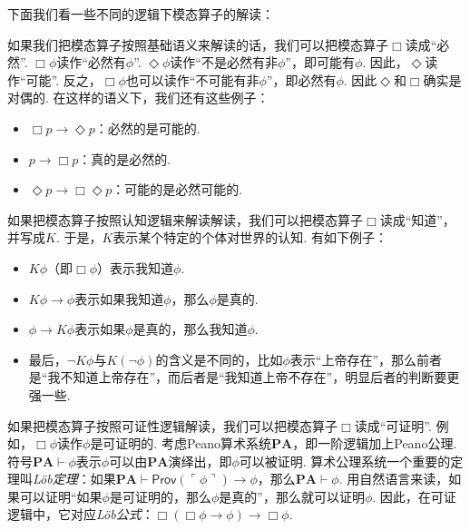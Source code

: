 下面我们看一些不同的逻辑下模态算子的解读：

\begin{example}[基础语义]
如果我们把模态算子按照基础语义来解读的话，我们可以把模态算子$\Box$读成“必然”. $\Box\phi$读作“必然有$\phi$”. $\Diamond\phi$读作“不是必然有非$\phi$”，即可能有$\phi$. 因此，$\Diamond$读作“可能”. 反之，$\Box\phi$也可以读作“不可能有非$\phi$”，即必然有$\phi$. 因此$\Diamond$和$\Box$确实是对偶的. 在这样的语义下，我们还有这些例子：
\begin{itemize}
    \item $\Box p\to\Diamond p$：必然的是可能的.
    \item $p\to\Box p$：真的是必然的.
    \item $\Diamond p\to\Box\Diamond p$：可能的是必然可能的.
\end{itemize}
\end{example}

\begin{example}[认知语义]
    如果把模态算子按照认知逻辑来解读解读，我们可以把模态算子$\Box$读成“知道”，并写成$K$. 于是，$K$表示某个特定的个体对世界的认知. 有如下例子：
    \begin{itemize}
        \item $K\phi$（即$\Box\phi$）表示我知道$\phi$. 
        \item $K\phi\to\phi$表示如果我知道$\phi$，那么$\phi$是真的. 
        \item $\phi\to K\phi$表示如果$\phi$是真的，那么我知道$\phi$. 
        \item 最后，$\neg K\phi$与$K(\neg\phi)$的含义是不同的，比如$\phi$表示“上帝存在”，那么前者是“我不知道上帝存在”，而后者是“我知道上帝不存在”，明显后者的判断要更强一些.
\end{itemize}
\end{example}

\newcommand{\PA}{\mathbf{PA}}

\begin{example}[可证性语义]
如果把模态算子按照可证性逻辑解读，我们可以把模态算子$\Box$读成“可证明”. 例如，$\Box\phi$读作$\phi$是可证明的. 考虑Peano算术系统$\PA$，即一阶逻辑加上Peano公理. 符号$\PA\vdash \phi$表示$\phi$可以由$\PA$演绎出，即$\phi$可以被证明. 算术公理系统一个重要的定理叫\emph{Löb定理}：如果$\PA\vdash\mathsf{Prov}(\ulcorner\phi\urcorner)\to\phi$，那么$\PA\vdash\phi$. 用自然语言来读，如果可以证明“如果$\phi$是可证明的，那么$\phi$是真的”，那么就可以证明$\phi$. 因此，在可证逻辑中，它对应\emph{Löb公式}：$\Box(\Box\phi\to\phi)\to\Box\phi$. 
\end{example}

